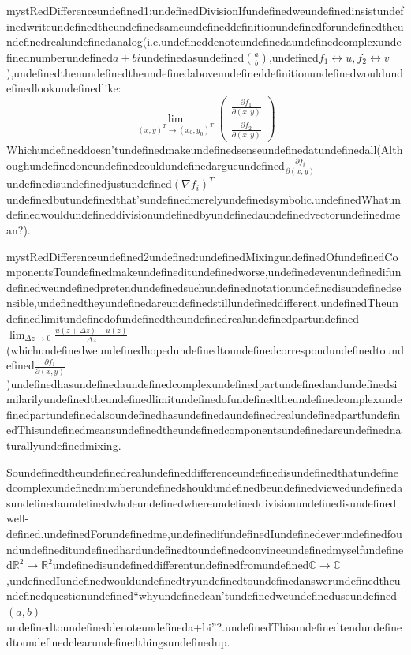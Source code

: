 \begin{mystadmonition}{mystRed}{Differenceundefined1:undefinedDivision}\label{division}Ifundefinedweundefinedinsistundefinedwriteundefinedtheundefinedsameundefineddefinitionundefinedforundefinedtheundefinedrealundefinedanalog(i.e.undefineddenoteundefinedaundefinedcomplexundefinednumberundefined$a+bi$undefinedasundefined$a \choose b$,undefined$f_1\leftrightarrow u, f_2\leftrightarrow v$),undefinedthenundefinedtheundefinedaboveundefineddefinitionundefinedwouldundefinedlookundefinedlike:
\begin{equation}
\lim_{(x,y)^T \to (x_0,y_0)^T}
\begin{pmatrix}
\frac{\partial f_1}{\partial (x, y)} \\
\frac{\partial f_2}{\partial (x, y)}
\end{pmatrix}
\end{equation}
Whichundefineddoesn'tundefinedmakeundefinedsenseundefinedatundefinedall(Althoughundefinedoneundefinedcouldundefinedargueundefined$\frac{\partial f_i}{\partial (x,y)}$undefinedisundefinedjustundefined$(\nabla f_i)^T$undefinedbutundefinedthat'sundefinedmerelyundefinedsymbolic.undefinedWhatundefinedwouldundefineddivisionundefinedbyundefinedaundefinedvectorundefinedmean?).

\end{mystadmonition}
\begin{mystadmonition}{mystRed}{Differenceundefined2undefined:undefinedMixingundefinedOfundefinedComponents}\label{mixing-of-components}Toundefinedmakeundefineditundefinedworse,undefinedevenundefinedifundefinedweundefinedpretendundefinedsuchundefinednotationundefinedisundefinedsensible,undefinedtheyundefinedareundefinedstillundefineddifferent.undefinedTheundefinedlimitundefinedofundefinedtheundefinedrealundefinedpartundefined$\lim_{\Delta z\to 0}\frac{u(z+\Delta z) -u(z)}{\Delta z}$(whichundefinedweundefinedhopedundefinedtoundefinedcorrespondundefinedtoundefined$\frac{\partial f_1}{\partial (x,y)}$)undefinedhasundefinedaundefinedcomplexundefinedpartundefinedandundefinedsimilarilyundefinedtheundefinedlimitundefinedofundefinedtheundefinedcomplexundefinedpartundefinedalsoundefinedhasundefinedaundefinedrealundefinedpart!undefinedThisundefinedmeansundefinedtheundefinedcomponentsundefinedareundefinednaturallyundefinedmixing.

\end{mystadmonition}
Soundefinedtheundefinedrealundefineddifferenceundefinedisundefinedthatundefinedcomplexundefinednumberundefinedshouldundefinedbeundefinedviewedundefinedasundefinedaundefinedwholeundefinedwhereundefineddivisionundefinedisundefinedwell-defined.undefinedForundefinedme,undefinedifundefinedIundefinedeverundefinedfoundundefineditundefinedhardundefinedtoundefinedconvinceundefinedmyselfundefined$\mathbb{R}^2 \to \mathbb{R}^2$undefinedisundefineddifferentundefinedfromundefined$\mathbb{C} \to \mathbb{C}$,undefinedIundefinedwouldundefinedtryundefinedtoundefinedanswerundefinedtheundefinedquestionundefined``whyundefinedcan'tundefinedweundefineduseundefined$(a,b)$undefinedtoundefineddenoteundefineda+bi''?.undefinedThisundefinedtendundefinedtoundefinedclearundefinedthingsundefinedup.

